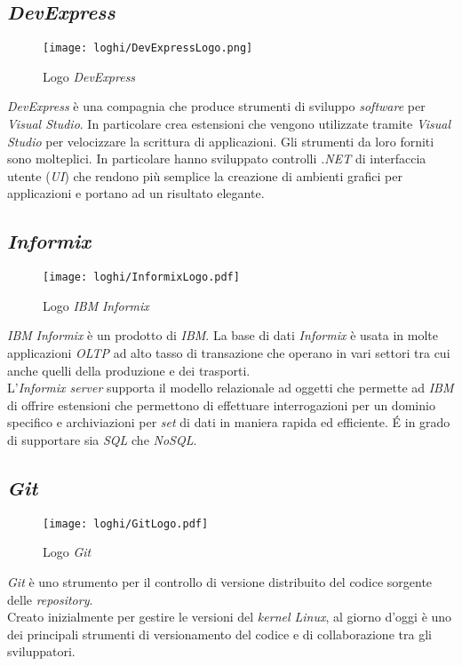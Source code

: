 \subsection*{\textit{DevExpress}}
\begin{figure}[!h] 
    \centering 
    \texttt{[image: loghi/DevExpressLogo.png]}
    \caption{Logo \textit{DevExpress}}
\end{figure}
\noindent \textit{DevExpress} è una compagnia che produce strumenti di sviluppo \textit{software} per
\textit{Visual Studio}. In particolare crea estensioni che vengono utilizzate tramite \textit{Visual Studio}
per velocizzare la scrittura di applicazioni. Gli strumenti da loro forniti sono
molteplici. In particolare hanno sviluppato controlli \textit{.NET} di interfaccia utente (\textit{UI}) che
rendono più semplice la creazione di ambienti grafici per applicazioni e portano ad un risultato
elegante.

\subsection*{\textit{Informix}}
\begin{figure}[!h] 
    \centering 
    \texttt{[image: loghi/InformixLogo.pdf]}
    \caption{Logo \textit{IBM} \textit{Informix}}
\end{figure}
\noindent \textit{IBM} \textit{Informix} è un prodotto di \textit{IBM}. La base di dati \textit{Informix} è usata in molte
applicazioni \textit{OLTP} ad alto tasso di transazione che operano in vari settori tra cui anche quelli della produzione e dei trasporti.\\
L’\textit{Informix server} supporta il modello relazionale ad oggetti che permette ad \textit{IBM} di
offrire estensioni che permettono di effettuare interrogazioni per un dominio specifico
e archiviazioni per \textit{set} di dati in maniera rapida ed efficiente.
É in grado di supportare sia \textit{SQL} che \textit{NoSQL}.

\subsection*{\textit{Git}}
\begin{figure}[!h] 
    \centering 
    \texttt{[image: loghi/GitLogo.pdf]}
    \caption{Logo \textit{Git}}
\end{figure}
\noindent \textit{Git} è uno strumento per il controllo di versione distribuito del codice sorgente delle \textit{repository}.\\
Creato inizialmente per gestire le versioni del \textit{kernel Linux}, al giorno d'oggi è uno dei principali
strumenti di versionamento del codice e di collaborazione tra gli sviluppatori.